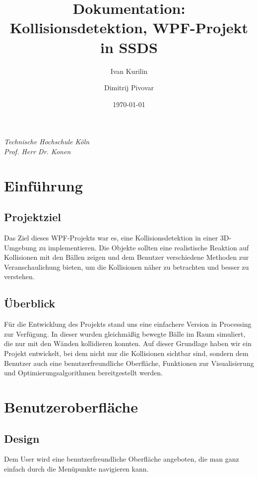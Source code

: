 \documentclass[12pt,a4paper]{article}
\title{Dokumentation: Kollisionsdetektion, WPF-Projekt in SSDS}
\author{Ivan Kurilin \and Dimitrij Pivovar}
\date{\today}
\begin{document}
	\maketitle
	\begin{center}
		\textit{Technische Hochschule Köln }\\		
		\textit{Prof. Herr Dr. Konen}
	\end{center}
	\section{Einführung}	
	\subsection{Projektziel}
	
Das Ziel dieses WPF-Projekts war es, eine Kollisionsdetektion in einer 3D-Umgebung zu implementieren. Die Objekte sollten eine realistische Reaktion auf Kollisionen mit den Bällen zeigen und dem Benutzer verschiedene Methoden zur Veranschaulichung bieten, um die Kollisionen näher zu betrachten und besser zu verstehen.
	
	\subsection{Überblick}
	
Für die Entwicklung des Projekts stand uns eine einfachere Version in Processing zur Verfügung. In dieser wurden gleichmäßig bewegte Bälle im Raum simuliert, die nur mit den Wänden kollidieren konnten. Auf dieser Grundlage haben wir ein Projekt entwickelt, bei dem nicht nur die Kollisionen sichtbar sind, sondern dem Benutzer auch eine benutzerfreundliche Oberfläche, Funktionen zur Visualisierung und Optimierungsalgorithmen bereitgestellt werden.
	
	\section{Benutzeroberfläche}
	\subsection{Design}
	Dem User wird eine benutzerfreundliche Oberfläche angeboten, die man ganz einfach durch die Menüpunkte navigieren kann. 
	
\end{document}
